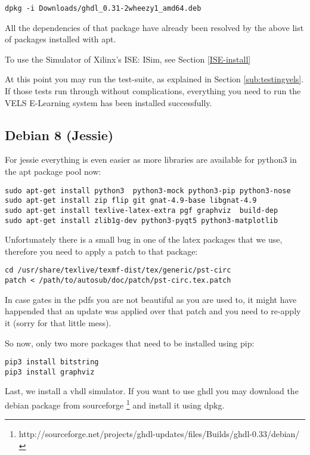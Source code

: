 \begin{verbatim}
dpkg -i Downloads/ghdl_0.31-2wheezy1_amd64.deb
\end{verbatim}

All the dependencies of that package have already been resolved by the above
list of packages installed with apt.

To use the Simulator of Xilinx's ISE: ISim, see Section \ref{ISE-install}

At this point you may run the test-suite, as explained in Section \ref{sub:testingvels}.
If those tests run through without complications, everything you need to run the VELS
E-Learning system has been installed successfully.

\subsection{Debian 8 (Jessie)}

For jessie everything is even easier as more libraries are available for python3 in the
apt package pool now:

\begin{verbatim}
sudo apt-get install python3  python3-mock python3-pip python3-nose
sudo apt-get install zip flip git gnat-4.9-base libgnat-4.9
sudo apt-get install texlive-latex-extra pgf graphviz  build-dep
sudo apt-get install zlib1g-dev python3-pyqt5 python3-matplotlib  
\end{verbatim}

Unfortunately there is a small bug in one of the latex packages that we use,
therefore you need to apply a patch to that package:

\begin{verbatim}
cd /usr/share/texlive/texmf-dist/tex/generic/pst-circ
patch < /path/to/autosub/doc/patch/pst-circ.tex.patch
\end{verbatim}

In case gates in the pdfs you are not beautiful as you are used to, it might have
happended that an update was applied over that patch and you need to re-apply it (sorry for that little mess).

So now, only two more packages that need to be installed using pip:

\begin{verbatim}
pip3 install bitstring
pip3 install graphviz
\end{verbatim}

Last, we install a vhdl simulator. If you want to use ghdl you may download
the debian package from sourceforge \footnote{http://sourceforge.net/projects/ghdl-updates/files/Builds/ghdl-0.33/debian/}
and install it using dpkg.

